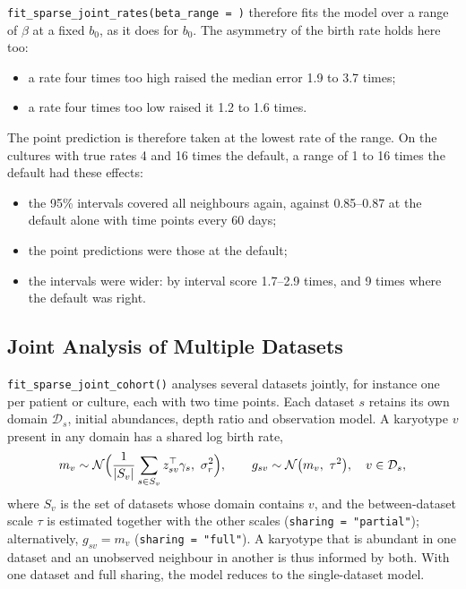 \documentclass[11pt]{article}
\newcommand{\Normal}{\mathcal{N}}
\begin{document}
\texttt{fit\_sparse\_joint\_rates(beta\_range = )} therefore fits the model
over a range of $\beta$ at a fixed $b_0$, as it does for $b_0$. The
asymmetry of the birth rate holds here too:
\begin{itemize}
\item a rate four times too high raised the median error 1.9 to 3.7 times;
\item a rate four times too low raised it 1.2 to 1.6 times.
\end{itemize}
The point prediction is therefore taken at the lowest rate of the range.
On the cultures with true rates 4 and 16 times the default, a range of 1 to
16 times the default had these effects:
\begin{itemize}
\item the 95\% intervals covered all neighbours again, against 0.85--0.87
  at the default alone with time points every 60 days;
\item the point predictions were those at the default;
\item the intervals were wider: by interval score 1.7--2.9 times, and 9
  times where the default was right.
\end{itemize}

\subsection{Joint Analysis of Multiple Datasets}
\label{sec:sj-cohort}

\texttt{fit\_sparse\_joint\_cohort()} analyses several datasets jointly, for
instance one per patient or culture, each with two time points. Each
dataset $s$ retains its own domain $\mathcal{D}_s$, initial abundances, depth
ratio and observation model. A karyotype $v$ present in any domain has a
shared log birth rate,
\begin{equation}
  m_v\sim\Normal\Bigl(\frac{1}{|S_v|}\sum_{s\in S_v}z_{sv}^\top\gamma_s,\ \sigma_r^2\Bigr),
  \qquad
  g_{sv}\sim\Normal\bigl(m_v,\ \tau^2\bigr),\quad v\in\mathcal{D}_s,
  \label{eq:cohort}
\end{equation}
where $S_v$ is the set of datasets whose domain contains $v$, and the
between-dataset scale $\tau$ is estimated together with the other scales
(\texttt{sharing = "partial"}); alternatively, $g_{sv}=m_v$
(\texttt{sharing = "full"}). A karyotype that is abundant in one dataset and an
unobserved neighbour in another is thus informed by both. With one dataset and
full sharing, the model reduces to the single-dataset model.
\end{document}
